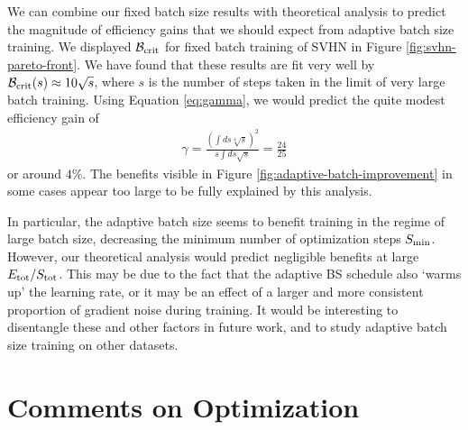 \documentclass[english]{article}
\begin{document}
We can combine our fixed batch size results with theoretical analysis to predict the magnitude of efficiency gains that we should expect from adaptive batch size training. We displayed $\mathcal{B}_{{\rm crit}}$ for fixed batch training of SVHN in Figure \ref{fig:svhn-pareto-front}. We have found that these results are fit very well by $\mathcal{B}_{{\rm crit}}(s)\approx10\sqrt{s}$, where $s$ is the number of steps taken in the limit of very large batch training. Using Equation \ref{eq:gamma}, we would predict the quite modest efficiency gain of
\begin{eqnarray}
\gamma=\frac{\left(\int ds\sqrt[4]{s}\right)^{2}}{s\int ds\sqrt{s}}=\frac{24}{25}
\end{eqnarray}
or around $4\%$. The benefits visible in Figure \ref{fig:adaptive-batch-improvement} in some cases appear too large to be fully explained by this analysis.

In particular, the adaptive batch size seems to benefit training in the regime of large batch size, decreasing the minimum number of optimization steps $S_{{\rm min}}$. However, our theoretical analysis would predict negligible benefits at large $E_{{\rm tot}}/S_{{\rm tot}}$. This may be due to the fact that the adaptive BS schedule also `warms up' the learning rate, or it may be an effect of a larger and more consistent proportion of gradient noise during training. It would be interesting to disentangle these and other factors in future work, and to study adaptive batch size training on other datasets.

\section{Comments on Optimization}
\end{document}
